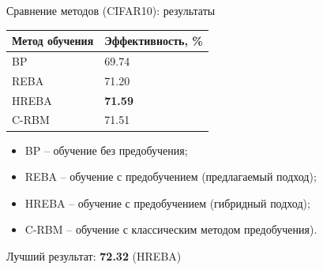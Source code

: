 \documentclass[10pt]{beamer}
\begin{document}
        \begin{frame}{Сравнение методов (CIFAR10): результаты}
            \begin{table} [!h]
              \small
            \centering
            \begin{tabular}{| p{3cm} | p{3cm} |}
              \hline
                \textbf{Метод обучения} & \textbf{Эффективность, \%}\\
                \hline
                BP & 69.74\\
                \hline
                REBA & 71.20\\
                \hline
                HREBA & \textbf{71.59}\\
                \hline
                C-RBM & 71.51\\
                \hline
            \end{tabular}
            \end{table}
            \begin{itemize}
                \item BP -- обучение без предобучения; 
                \item REBA -- обучение с предобучением (предлагаемый подход); 
                \item HREBA -- обучение с предобучением (гибридный подход);
                \item C-RBM -- обучение с классическим методом предобучения).
            \end{itemize}
            Лучший результат: \textbf{72.32} (HREBA)\\

        \end{frame}
\end{document}
